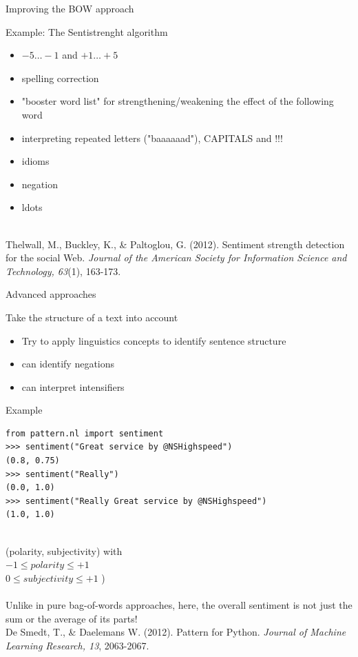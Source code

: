 \documentclass{beamer}
\begin{document}
\begin{frame}{Improving the BOW approach}
\begin{block}{Example: The Sentistrenght algorithm}
\begin{itemize}
\item $-5\ldots-1$ and $+1\ldots+5$
\item spelling correction
\item "booster word list" for strengthening/weakening the effect of the following word
\item interpreting repeated letters ("baaaaaad"), CAPITALS and !!!
\item idioms
\item negation 
\item ldots
\end{itemize}
\end{block}
~ \\
\tiny{Thelwall, M., Buckley, K., \& Paltoglou, G. (2012). Sentiment strength detection for the social Web. \emph{Journal of the American Society for Information Science and Technology, 63}(1), 163-173.\\}
\end{frame}


\begin{frame}{Advanced approaches}
\begin{block}{Take the structure of a text into account}
\begin{itemize}
\item Try to apply linguistics concepts to identify sentence structure
\item can identify negations
\item can interpret intensifiers
\end{itemize}
\end{block}
\end{frame}


\begin{frame}[fragile]{Example}
\begin{lstlisting}
from pattern.nl import sentiment
>>> sentiment("Great service by @NSHighspeed")
(0.8, 0.75)
>>> sentiment("Really")
(0.0, 1.0)
>>> sentiment("Really Great service by @NSHighspeed")
(1.0, 1.0)
\end{lstlisting}
~\\
\footnotesize{(polarity, subjectivity) with \\
 $-1 \leq polarity \leq +1$\\
 $0 \leq subjectivity \leq +1$ )\\} ~ \\
Unlike in pure bag-of-words approaches, here, the overall sentiment is not just the sum or the average of its parts! \\
\tiny{De Smedt, T., \& Daelemans W. (2012).  Pattern for Python. \emph{Journal of Machine Learning Research, 13}, 2063-2067.}
\end{frame}
\end{document}
